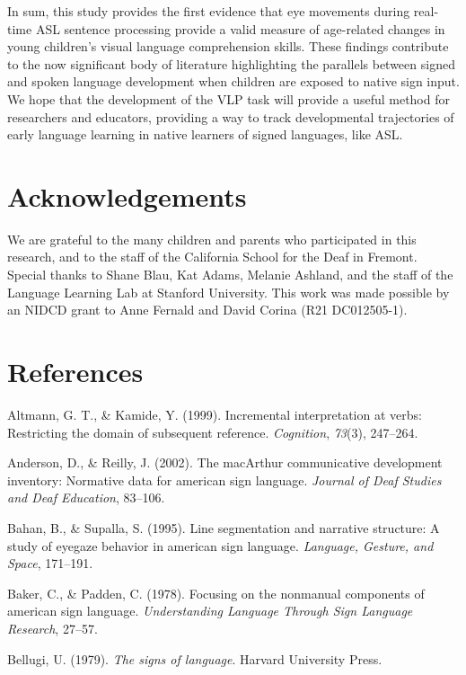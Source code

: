 \documentclass[12pt,]{article}
\begin{document}
In sum, this study provides the first evidence that eye movements during
real-time ASL sentence processing provide a valid measure of age-related
changes in young children's visual language comprehension skills. These
findings contribute to the now significant body of literature
highlighting the parallels between signed and spoken language
development when children are exposed to native sign input. We hope that
the development of the VLP task will provide a useful method for
researchers and educators, providing a way to track developmental
trajectories of early language learning in native learners of signed
languages, like ASL.

\section{Acknowledgements}\label{acknowledgements}

We are grateful to the many children and parents who participated in
this research, and to the staff of the California School for the Deaf in
Fremont. Special thanks to Shane Blau, Kat Adams, Melanie Ashland, and
the staff of the Language Learning Lab at Stanford University. This work
was made possible by an NIDCD grant to Anne Fernald and David Corina
(R21 DC012505-1).

\newpage 

\section*{References}\label{references}

Altmann, G. T., \& Kamide, Y. (1999). Incremental interpretation at
verbs: Restricting the domain of subsequent reference. \emph{Cognition},
\emph{73}(3), 247--264.

Anderson, D., \& Reilly, J. (2002). The macArthur communicative
development inventory: Normative data for american sign language.
\emph{Journal of Deaf Studies and Deaf Education}, 83--106.

Bahan, B., \& Supalla, S. (1995). Line segmentation and narrative
structure: A study of eyegaze behavior in american sign language.
\emph{Language, Gesture, and Space}, 171--191.

Baker, C., \& Padden, C. (1978). Focusing on the nonmanual components of
american sign language. \emph{Understanding Language Through Sign
Language Research}, 27--57.

Bellugi, U. (1979). \emph{The signs of language}. Harvard University
Press.
\end{document}
